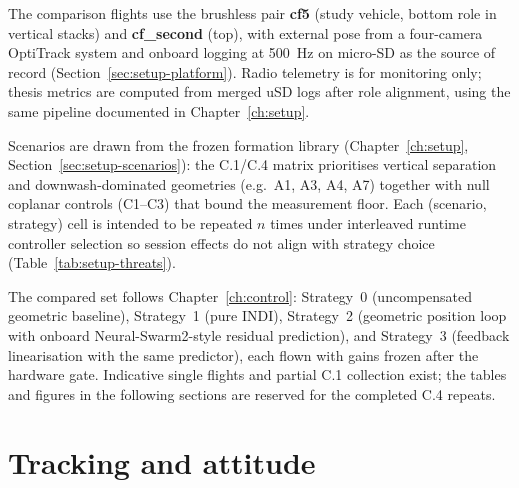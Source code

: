 The comparison flights use the brushless pair \textbf{cf5} (study vehicle, bottom role in vertical
stacks) and \textbf{cf\_second} (top), with external pose from a four-camera OptiTrack system and
onboard logging at \SI{500}{\hertz} on micro-SD as the source of record (Section~\ref{sec:setup-platform}).
Radio telemetry is for monitoring only; thesis metrics are computed from merged uSD logs after role
alignment, using the same pipeline documented in Chapter~\ref{ch:setup}.

Scenarios are drawn from the frozen formation library (Chapter~\ref{ch:setup}, Section~\ref{sec:setup-scenarios}):
the C.1/C.4 matrix prioritises vertical separation and downwash-dominated geometries (e.g.\ A1,
A3, A4, A7) together with null coplanar controls (C1--C3) that bound the measurement floor. Each
(scenario, strategy) cell is intended to be repeated $n$ times under interleaved runtime controller
selection so session effects do not align with strategy choice (Table~\ref{tab:setup-threats}).

The compared set follows Chapter~\ref{ch:control}: Strategy~0 (uncompensated geometric baseline),
Strategy~1 (pure INDI), Strategy~2 (geometric position loop with onboard Neural-Swarm2-style
residual prediction), and Strategy~3 (feedback linearisation with the same predictor), each flown
with gains frozen after the hardware gate. Indicative single flights and partial C.1 collection
exist; the tables and figures in the following sections are reserved for the completed C.4 repeats.


\section{Tracking and attitude}
\label{sec:res2-tracking}

